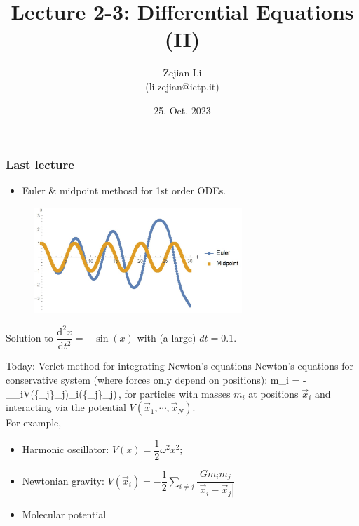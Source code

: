\documentclass[11pt,aspectratio=169,handout]{beamer}
\begin{document}
	
\author{Zejian Li \\(li.zejian@ictp.it)}
\title{Lecture 2-3: Differential Equations (II)}
\date{25. Oct. 2023}


\begin{frame}[plain]
	\maketitle
\end{frame}


\begin{frame}
\frametitle{Last lecture}

\begin{itemize}
	\item Euler \& midpoint methosd for 1st order ODEs.
\end{itemize}
\begin{figure}
	\includegraphics[width=0.7\textwidth]{fig/euler-vs-mid}
\end{figure}
\begin{center}
	Solution to $\dfrac{\mathrm{d}^2 x}{\mathrm{d}t^2} = -\sin(x)$ with (a large) $dt = 0.1$.
\end{center}
\end{frame}

\begin{frame}{Today: Verlet method for integrating Newton's equations}
	Newton's equations for conservative system (where forces only depend on positions):
	\bea
		m_i  = -\vec{\nabla}_{_i}V(\{_j\}_j)\equiv {}_i(\{_j\}_j)\,,
	\eea
	for particles with masses $m_i$ at positions $\vec{x}_i$ and interacting via the potential $V(\vec{x}_1,\cdots,\vec{x}_N)$.\\
	For example,\pause
	\begin{itemize}[<+->]
		\item Harmonic oscillator: $V(x) = \dfrac{1}{2}\omega^2 x^2$;
		\item Newtonian gravity: $V({\vec{x}_i}) = -\dfrac{1}{2}\sum_{i\neq j} \dfrac{G m_i m_j}{| \vec{x}_i - \vec{x}_j |}$
		\item Molecular potential
	\end{itemize}
\end{frame}
\end{document}
